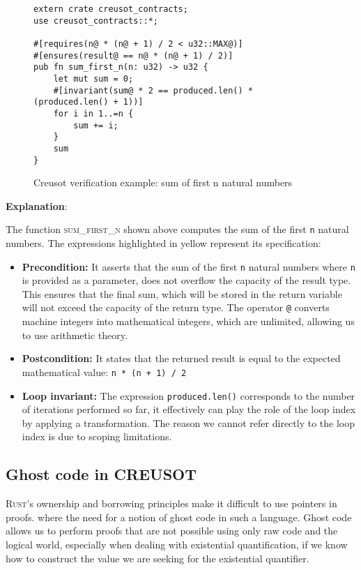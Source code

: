 \documentclass[11pt,a4paper]{report}
\begin{document}
\begin{figure}[h]
\centering
\begin{minipage}{0.95\linewidth}
\begin{verbatim}
extern crate creusot_contracts;
use creusot_contracts::*;

#[requires(n@ * (n@ + 1) / 2 < u32::MAX@)]
#[ensures(result@ == n@ * (n@ + 1) / 2)]
pub fn sum_first_n(n: u32) -> u32 {
    let mut sum = 0;
    #[invariant(sum@ * 2 == produced.len() * (produced.len() + 1))]
    for i in 1..=n {
        sum += i;
    }
    sum
}
\end{verbatim}
\caption{Creusot verification example: sum of first n natural numbers}
\label{fig:sum-example}
\end{minipage}
\end{figure}

\textbf{Explanation}: 

The function \textsc{sum\_first\_n} shown above computes the sum of the first \texttt{n} natural numbers. The expressions highlighted in yellow represent its specification:
\begin{itemize}
\item \textbf{Precondition:} It asserts that the sum of the first \texttt{n} natural numbers where \texttt{n} is provided as a parameter, does not overflow the capacity of the result type. This ensures that the final sum, which will be stored in the return variable will not exceed the capacity of the return type. The operator \texttt{@} converts machine integers into mathematical integers, which are unlimited, allowing us to use arithmetic theory.
\item \textbf{Postcondition:} It states that the returned result is equal to the expected mathematical value: \texttt{n * (n + 1) / 2}
\item \textbf{Loop invariant:} The expression \texttt{produced.len()} corresponds to the number of iterations performed so far, it effectively can play the role of the loop index by applying a transformation. The reason we cannot refer directly to the loop index is due to scoping limitations.
\end{itemize}
\subsection{Ghost code in \textsc{CREUSOT}}
\textsc{Rust}'s ownership and borrowing principles make it difficult to use pointers in proofs. where the need for a notion of ghost code in such a language. Ghost code allows us to perform proofs that are not possible using only raw code and the logical world, especially when dealing with existential quantification, if we know how to construct the value we are seeking for the existential quantifier.
\end{document}
